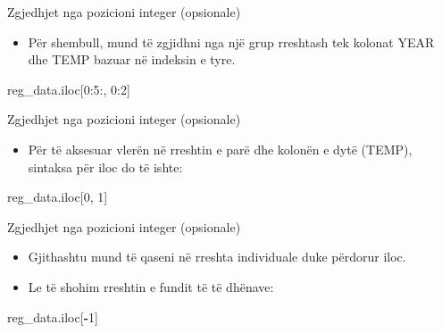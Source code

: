 \documentclass[
  ignorenonframetext,
]{beamer}
\newenvironment{Shaded}{\begin{snugshade}}{\end{snugshade}}
\newcommand{\DecValTok}[1]{\textcolor[rgb]{0.00,0.00,0.81}{#1}}
\newcommand{\NormalTok}[1]{#1}
\newcommand{\OperatorTok}[1]{\textcolor[rgb]{0.81,0.36,0.00}{\textbf{#1}}}
\providecommand{\tightlist}{%
  \setlength{\itemsep}{0pt}\setlength{\parskip}{0pt}}
\begin{document}
\begin{frame}[fragile]{Zgjedhjet nga pozicioni integer (opsionale)}
\protect\hypertarget{zgjedhjet-nga-pozicioni-integer-opsionale-2}{}
\begin{itemize}
\tightlist
\item
  Për shembull, mund të zgjidhni nga një grup rreshtash tek kolonat YEAR
  dhe TEMP bazuar në indeksin e tyre.
\end{itemize}

\begin{Shaded}
\begin{Highlighting}[]
\NormalTok{reg\_data.iloc[}\DecValTok{0}\NormalTok{:}\DecValTok{5}\NormalTok{:, }\DecValTok{0}\NormalTok{:}\DecValTok{2}\NormalTok{]}
\end{Highlighting}
\end{Shaded}
\end{frame}

\begin{frame}[fragile]{Zgjedhjet nga pozicioni integer (opsionale)}
\protect\hypertarget{zgjedhjet-nga-pozicioni-integer-opsionale-3}{}
\begin{itemize}
\tightlist
\item
  Për të aksesuar vlerën në rreshtin e parë dhe kolonën e dytë (TEMP),
  sintaksa për iloc do të ishte:
\end{itemize}

\begin{Shaded}
\begin{Highlighting}[]
\NormalTok{reg\_data.iloc[}\DecValTok{0}\NormalTok{, }\DecValTok{1}\NormalTok{]}
\end{Highlighting}
\end{Shaded}
\end{frame}

\begin{frame}[fragile]{Zgjedhjet nga pozicioni integer (opsionale)}
\protect\hypertarget{zgjedhjet-nga-pozicioni-integer-opsionale-4}{}
\begin{itemize}
\item
  Gjithashtu mund të qaseni në rreshta individuale duke përdorur iloc.
\item
  Le të shohim rreshtin e fundit të të dhënave:
\end{itemize}

\begin{Shaded}
\begin{Highlighting}[]
\NormalTok{reg\_data.iloc[}\OperatorTok{{-}}\DecValTok{1}\NormalTok{]}
\end{Highlighting}
\end{Shaded}
\end{frame}
\end{document}
